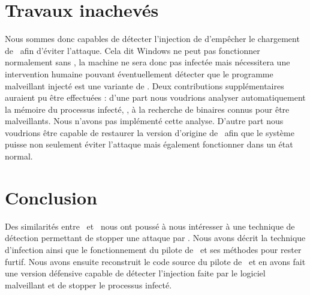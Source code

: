 \section{Travaux inachevés}
Nous sommes donc capables de détecter l'injection de d'empêcher le chargement de \services\ afin d'éviter l'attaque.
Cela dit Windows ne peut pas fonctionner normalement sans \services, la machine ne sera donc pas infectée mais nécessitera une intervention humaine pouvant éventuellement détecter que le programme malveillant injecté est une variante de \stux.
Deux contributions supplémentaires auraient pu être effectuées : d'une part nous voudrions analyser automatiquement la mémoire du processus infecté, \services, à la recherche de binaires connus pour être malveillants. 
Nous n'avons pas implémenté cette analyse.
D'autre part nous voudrions être capable de restaurer la version d'origine de \services\ afin que le système puisse non seulement éviter l'attaque mais également fonctionner dans un état normal.

\section{Conclusion}
Des similarités entre \duqu\ et \stux\ nous ont poussé à nous intéresser à une technique de détection permettant de stopper une attaque par \duqu.
Nous avons décrit la technique d'infection ainsi que le fonctionnement du pilote de \duqu\ et ses méthodes pour rester furtif.
Nous avons ensuite reconstruit le code source du pilote de \duqu\ et en avons fait une version défensive capable de détecter l'injection faite par le logiciel malveillant et de stopper le processus infecté.

